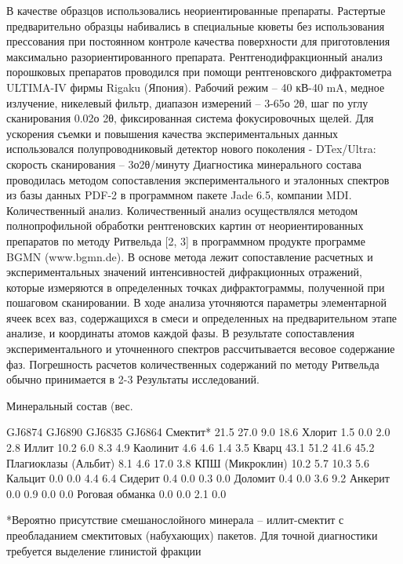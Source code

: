 В качестве образцов использовались неориентированные препараты. Растертые предварительно образцы набивались в специальные кюветы без использования прессования при постоянном контроле качества поверхности для приготовления максимально разориентированного препарата.
Рентгенодифракционный анализ порошковых препаратов проводился при помощи рентгеновского дифрактометра ULTIMA-IV фирмы Rigaku (Япония). Рабочий режим – 40 кВ-40 mA, медное излучение, никелевый фильтр, диапазон измерений – 3-65о 2θ, шаг по углу сканирования 0.02о 2θ, фиксированная система фокусировочных щелей. Для ускорения съемки и повышения качества экспериментальных данных использовался полупроводниковый детектор нового поколения -  DTex/Ultra: скорость сканирования – 3о2θ/минуту 
Диагностика минерального состава проводилась методом сопоставления экспериментального и эталонных спектров из базы данных PDF-2 в программном пакете Jade 6.5, компании MDI. 
Количественный анализ. Количественный анализ осуществлялся методом полнопрофильной обработки рентгеновских картин от неориентированных препаратов по методу Ритвельда [2, 3] в программном продукте программе BGMN (www.bgmn.de). В основе метода лежит сопоставление расчетных и экспериментальных значений интенсивностей дифракционных отражений, которые измеряются в определенных точках дифрактограммы, полученной при пошаговом сканировании. В ходе анализа уточняются параметры элементарной ячеек всех ваз, содержащихся в смеси и определенных на предварительном этапе анализе, и координаты атомов каждой фазы. В результате сопоставления экспериментального и уточненного спектров рассчитывается весовое содержание фаз. Погрешность расчетов количественных содержаний по методу Ритвельда обычно принимается в 2-3%
Результаты исследований.

Минеральный состав (вес. %

	GJ6874	GJ6890	GJ6835	GJ6864
Смектит*	21.5	27.0	9.0	18.6
Хлорит	1.5	0.0	2.0	2.8
Иллит	10.2	6.0	8.3	4.9
Каолинит	4.6	4.6	1.4	3.5
Кварц	43.1	51.2	41.6	45.2
Плагиоклазы (Альбит)	8.1	4.6	17.0	3.8
КПШ (Микроклин)	10.2	5.7	10.3	5.6
Кальцит	0.0	0.0	4.4	6.4
Сидерит	0.4	0.0	0.3	0.0
Доломит	0.4	0.0	3.6	9.2
Анкерит	0.0	0.9	0.0	0.0
Роговая обманка	0.0	0.0	2.1	0.0

*Вероятно присутствие смешанослойного минерала – иллит-смектит с преобладанием смектитовых (набухающих) пакетов. Для точной диагностики требуется выделение глинистой фракции




